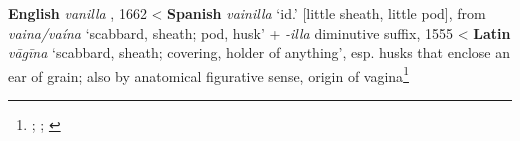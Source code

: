 \begin{etymology}\label{ety:vanilla}
\textbf{English} \textit{vanilla }, 1662
< \textbf{Spanish} \textit{vainilla} `id.' [little sheath, little pod], from \textit{vaina/vaína} `scabbard, sheath; pod, husk' + \textit{-illa} diminutive suffix, 1555
< \textbf{Latin} \textit{vāgīna} `scabbard, sheath; covering, holder of anything', esp. husks that enclose an ear of grain; also by anatomical figurative sense, origin of vagina\footnote{\textcite[s.v. vanilla]{oed}; \textcites[538]{gomez_de_silva_elseviers_1985}[596]{corominas_breve_1987}; \textcite[s.v. vāgīna]{lewis_latin_1879}}
\end{etymology}
